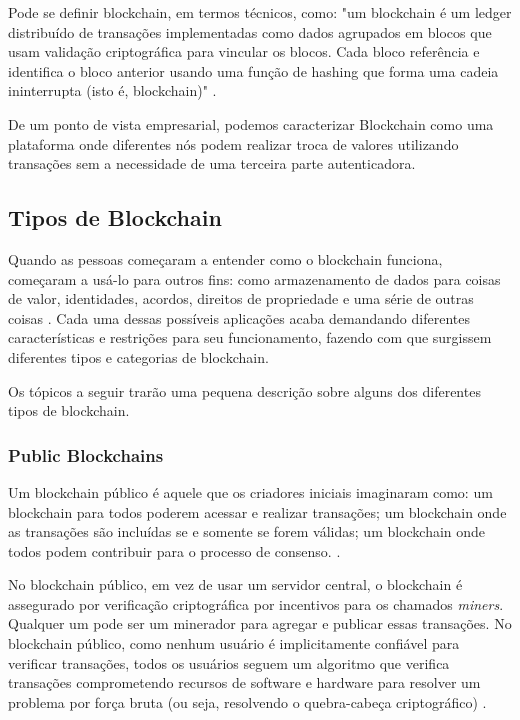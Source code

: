     Pode se definir blockchain, em termos técnicos, como: "um blockchain é um ledger distribuído de transações implementadas como dados agrupados em blocos que usam validação criptográfica para vincular os blocos. Cada bloco referência e identifica o bloco anterior usando uma função de hashing que forma uma cadeia ininterrupta (isto é, blockchain)" \cite{blockchain_pratical_guide}.
    
    De um ponto de vista empresarial, podemos caracterizar Blockchain como uma plataforma onde diferentes nós podem realizar troca de valores utilizando transações sem a necessidade de uma terceira parte autenticadora.
    
    
    
    \subsection{Tipos de Blockchain}
    \label{subsection_tipos_blockchain}

    Quando as pessoas começaram a entender como o blockchain funciona, começaram a usá-lo para outros fins: como armazenamento de dados para coisas de valor, identidades, acordos, direitos de propriedade e uma série de outras coisas \cite{blockchain_pratical_guide}. Cada uma dessas possíveis aplicações acaba demandando diferentes características e restrições para seu funcionamento, fazendo com que surgissem diferentes tipos e categorias de blockchain.
    
    Os tópicos a seguir trarão uma pequena descrição sobre alguns dos diferentes tipos de blockchain.
    
    
    \subsubsection{Public Blockchains}
    
    Um blockchain público é aquele que os criadores iniciais imaginaram como: um blockchain para todos poderem acessar e realizar transações; um blockchain onde as transações são incluídas se e somente se forem válidas; um blockchain onde todos podem contribuir para o processo de consenso. \cite{blockchain_pratical_guide}.
    
    No blockchain público, em vez de usar um servidor central, o blockchain é assegurado por verificação criptográfica por incentivos para os chamados \textit{miners}. Qualquer um pode ser um minerador para agregar e publicar essas transações. No blockchain público, como nenhum usuário é implicitamente confiável para verificar transações, todos os usuários seguem um algoritmo que verifica transações comprometendo recursos de software e hardware para resolver um problema por força bruta (ou seja, resolvendo o quebra-cabeça criptográfico) \cite{blockchain_pratical_guide}.
    


